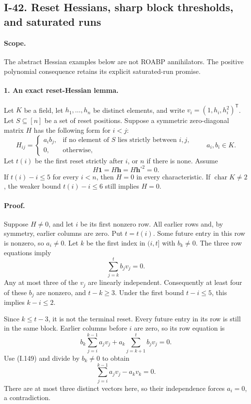 \subsection{I-42. Reset Hessians, sharp block thresholds, and saturated runs}
\label{I-42}

\paragraph{Scope.}
The abstract Hessian examples below are not ROABP annihilators.
The positive polynomial consequence retains its explicit
saturated-run promise.

\paragraph{1. An exact reset-Hessian lemma.}
Let $K$ be a field, let $h_1,\ldots,h_n$ be distinct elements,
and write $v_i=(1,h_i,h_i^2)^{\mathsf T}$. Let $S\subseteq[n]$
be a set of reset positions. Suppose a symmetric zero-diagonal
matrix $H$ has the following form for $i<j$:
\[
 H_{ij}=\begin{cases}
 a_i b_j,&\text{if no element of $S$ lies strictly between $i,j$},\\
 0,&\text{otherwise},
 \end{cases}
 \qquad a_i,b_i\in K.
 \tag{I.147}
\]
Let $t(i)$ be the first reset strictly after $i$, or $n$ if
there is none. Assume
\[
 H\mathbf1=H\mathbf h=H\mathbf h^{\circ2}=0.
 \tag{I.148}
\]
If $t(i)-i\le5$ for every $i<n$, then $H=0$ in every
characteristic. If $\operatorname{char}K\ne2$, the weaker
bound $t(i)-i\le6$ still implies $H=0$.

\paragraph{Proof.}
Suppose $H\ne0$, and let $i$ be its first nonzero row.
All earlier rows and, by symmetry, earlier columns are zero.
Put $t=t(i)$. Some future entry in this row is nonzero,
so $a_i\ne0$. Let $k$ be the first index in $(i,t]$ with
$b_k\ne0$. The three row equations imply
\[
 \sum_{j=k}^t b_jv_j=0.
 \tag{I.149}
\]
Any at most three of the $v_j$ are linearly independent.
Consequently at least four of these $b_j$ are nonzero, and
$t-k\ge3$. Under the first bound $t-i\le5$, this implies
$k-i\le2$.

Since $k\le t-3$, it is not the terminal reset. Every future
entry in its row is still in the same block. Earlier columns
before $i$ are zero, so its row equation is
\[
 b_k\sum_{j=i}^{k-1}a_jv_j+
 a_k\sum_{j=k+1}^t b_jv_j=0.
\]
Use (I.149) and divide by $b_k\ne0$ to obtain
\[
 \sum_{j=i}^{k-1}a_jv_j-a_kv_k=0.
 \tag{I.150}
\]
There are at most three distinct vectors here, so their
independence forces $a_i=0$, a contradiction.

